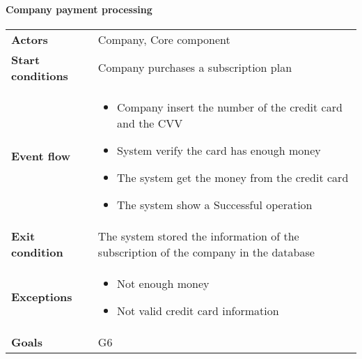 \paragraph{Company payment processing}
\begin{center}
\begin{table}[H]
\centering
\begin{tabular}{l|l}
\textbf{Actors} & Company, Core component \\
\textbf{Start conditions} & Company purchases a subscription plan \\
\textbf{Event flow}  & \begin{minipage}[t]{0.7\textwidth}
    \begin{itemize}
       \item Company insert the number of the credit card and the CVV
\item System verify the card has enough money
\item The system get the money from the credit card
\item The system show a Successful operation 


    \end{itemize}
    
\end{minipage} \\
\textbf{Exit condition} & The system stored the information of the subscription of the company in the database \\
\textbf{Exceptions} & \begin{minipage}[t]{0.7\textwidth}
    \begin{itemize}
       \item Not enough money
        \item Not valid credit card information
    \end{itemize}
    
\end{minipage} \\
\textbf{Goals} & G6 
\end{tabular}

\end{table}
\end{center}










